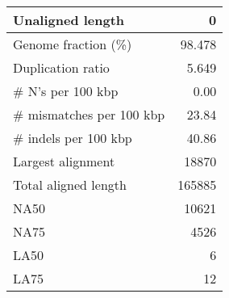 \documentclass[12pt,a4paper]{article}
\begin{document}
\begin{table}[ht]
\begin{center}
\begin{tabular}{|l*{1}{|r}|}
Unaligned length & 0 \\ \hline
Genome fraction (\%) & 98.478 \\ \hline
Duplication ratio & 5.649 \\ \hline
\# N's per 100 kbp & 0.00 \\ \hline
\# mismatches per 100 kbp & 23.84 \\ \hline
\# indels per 100 kbp & 40.86 \\ \hline
Largest alignment & 18870 \\ \hline
Total aligned length & 165885 \\ \hline
NA50 & 10621 \\ \hline
NA75 & 4526 \\ \hline
LA50 & 6 \\ \hline
LA75 & 12 \\ \hline
\end{tabular}
\end{center}
\end{table}
\end{document}

